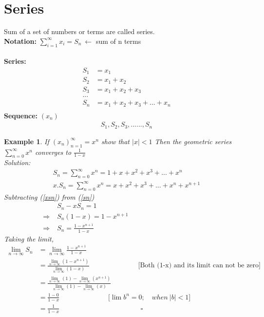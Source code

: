 \documentclass{article}
\newtheorem{example}{Example}[section]
\newcommand{\Rw}{\Rightarrow}
\newcommand{\hs}{\hspace}
\newcommand{\vs}{\vspace}
\newcommand{\ds}{\displaystyle}
\begin{document}
\section{Series}
Sum of a set of numbers or terms are called series.\\
\textbf{Notation:} $\ds \sum_{i=1}^{\infty} x_i = S_n\ \longleftarrow $ sum of n terms\\\\
\tabto{4cm} \textbf{Series:}\hs{2cm}
\begin{align*}
    S_1&=x_1\\
    S_2&=x_1 +x_2\\
    S_3&=x_1+x_2+x_3\\
    ...\\
    S_n&=x_1+x_2+x_3+...+x_n\\
\end{align*}
\tabto{4cm}\textbf{Sequence:} $(x_n)$\\
\begin{align*}
    S_1,S_2,S_3,......,S_n
\end{align*}
\begin{example}
    If $\ds (x_n)_{n=1}^\infty=x^n$ show that $|x|<1$ Then the geometric series $\ds \sum_{n=0}^{\infty} x^n$ converges to $\frac{1}{1-x}$\\
    \textit{Solution:}\\
    \begin{align}
        S_n=\sum_{n=0}^{\infty} x^n= 1+x+x^2+x^3+...+x^n \label{sn}\\
        x.S_n=\sum_{n=0}^{\infty} x^n= x+x^2+x^3+...+x^n+x^{n+1} \label{xsn}
    \end{align}
    Subtracting (\ref{xsn}) from (\ref{sn})\\
    \begin{align*}
        &S_n-xS_n=1 \hs{7cm}\\
        \Rw \;& S_n(1-x)=1-x^{n+1}\\
        \Rw \;& S_n= \ds \frac{1-x^{n+1}}{1-x}
    \end{align*}
    Taking the limit,
    \begin{align*}
        \lim_{n\to\infty} S_n &=\lim_{n\to\infty} \ds \frac{1-x^{n+1}}{1-x}\hs{7cm}\\
        &= \ds \frac{\ds \lim_{n\to\infty} (1-x^{n+1})}{\ds\lim_{n\to\infty} (1-x)}\hs{3cm}\text{[Both (1-x) and its limit can not be zero]}\\
        &= \frac{\ds\lim_{n\to\infty}(1)-\ds\lim_{n\to\infty}(x^{n+1})}{\ds\lim_{n\to\infty}(1)-\ds\lim_{n\to\infty}(x)}\\
        &=\frac{1-0}{1-x}\hs{3cm}\text{[$\lim b^n=0;\quad when \ |b|<1$]}\\
        &=\frac{1}{1-x}\hspace{5cm} \square
    \end{align*}
\end{example}\vs{0.5cm}
\end{document}
